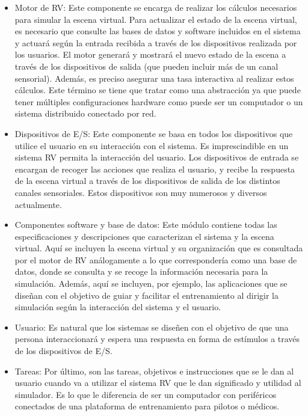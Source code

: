 \begin{itemize}
    \item Motor de \ac{RV}: Este componente se encarga de realizar los cálculos necesarios para simular la escena virtual. Para actualizar el estado de la escena virtual, es necesario que consulte las bases de datos y software incluidos en el sistema y actuará según la entrada recibida a través de los dispositivos realizada por los usuarios. El motor generará y mostrará el nuevo estado de la escena a través de los dispositivos de salida (que pueden incluir más de un canal sensorial). Además, es preciso asegurar una tasa interactiva al realizar estos cálculos. Este término se tiene que tratar como una abstracción ya que puede tener múltiples configuraciones hardware como puede ser un computador o un sistema distribuido conectado por red.
    \item Dispositivos de \ac{E/S}: Este componente se basa en todos los dispositivos que utilice el usuario en su interacción con el sistema. Es imprescindible en un sistema \ac{RV} permita la interacción del usuario. Los dispositivos de entrada se encargan de recoger las acciones que realiza el usuario, y recibe la respuesta de la escena virtual a través de los dispositivos de salida de los distintos canales sensoriales. Estos dispositivos son muy numerosos y diversos actualmente.
    \item Componentes software y base de datos: Este módulo contiene todas las especificaciones y descripciones que caracterizan el sistema y la escena virtual. Aquí se incluyen la escena virtual y su organización que es consultada por el motor de \ac{RV} análogamente a lo que correspondería como una base de datos, donde se consulta y se recoge la información necesaria para la simulación. Además, aquí se incluyen, por ejemplo, las aplicaciones que se diseñan con el objetivo de guiar y facilitar el entrenamiento al dirigir la simulación según la interacción del sistema y el usuario.
    \item Usuario: Es natural que los sistemas se diseñen con el objetivo de que una persona interaccionará y espera una respuesta en forma de estímulos a través de los dispositivos de \ac{E/S}. 
    \item Tareas: Por último, son las tareas, objetivos e instrucciones que se le dan al usuario cuando va a utilizar el sistema \ac{RV} que le dan significado y utilidad al simulador. Es lo que le diferencia de ser un computador con periféricos conectados de una plataforma de entrenamiento para pilotos o médicos. 
    
\end{itemize}

